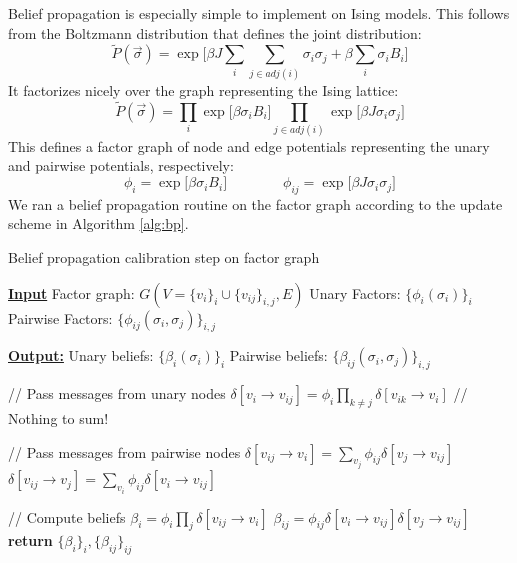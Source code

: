 \documentclass{article}
\begin{document}
Belief propagation is especially simple to implement on Ising models. 
This follows from the Boltzmann distribution that defines the joint distribution:
\begin{equation}\label{isingJoint}
    \tilde{P}(\vec{\sigma}) = \exp \Bigr [\beta J\sum_i \sum_{j \in adj(i)} \sigma_i \sigma_j + \beta \sum_i \sigma_i B_i \Bigr ]
\end{equation}
It factorizes nicely over the graph representing the Ising lattice:
\begin{equation}\label{gibbsFactorization}
    \tilde{P}(\vec{\sigma}) = \prod_i \exp \Bigr [\beta \sigma_i B_i \Bigr ] \prod_{j \in adj(i)} \exp \Bigr [ \beta J \sigma_i \sigma_j \Bigr ]
\end{equation}
This defines a factor graph of node and edge potentials representing the unary 
and pairwise potentials, respectively:
\[
    \phi_i = \exp \Bigr [\beta \sigma_i B_i \Bigr ]
    \qquad \qquad
    \phi_{ij} = \exp \Bigr [ \beta J \sigma_i \sigma_j \Bigr ]
\]
We ran a belief propagation routine on the factor graph according to the update 
scheme in Algorithm \ref{alg:bp}. 

\begin{algorithm}
    \caption{Belief propagation calibration step on factor graph}
    \begin{algorithmic}[1]
        \Statex \underline{\textbf{Input}}
        \Statex \quad Factor graph: $G(V = \{v_i\}_i \cup \{v_{ij}\}_{i, j}, E)$
        \Statex \quad Unary Factors: $\{\phi_i(\sigma_i)\}_i$
        \Statex \quad Pairwise Factors: $\{\phi_{ij}(\sigma_i, \sigma_j)\}_{i, j}$

        \Statex \underline{\textbf{Output:}}
        \Statex \quad Unary beliefs: $\{\beta_i(\sigma_i)\}_i$
        \Statex \quad Pairwise beliefs: $\{\beta_{ij}(\sigma_i, \sigma_j)\}_{i, j}$
        
        \Statex // Pass messages from unary nodes
        \State $\delta[v_i \rightarrow v_{ij}] = \phi_i \prod_{k \neq j} \delta[v_{ik} \rightarrow v_i]$ \quad // Nothing to sum!
        \EndFor
        \EndFor

        \Statex // Pass messages from pairwise nodes
        \State $\delta[v_{ij} \rightarrow v_i] = \sum_{v_j} \phi_{ij} \delta[v_j \rightarrow v_{ij}]$
        \State $\delta[v_{ij} \rightarrow v_j] = \sum_{v_i} \phi_{ij} \delta[v_i \rightarrow v_{ij}]$
        \EndFor
        \EndFor

        \Statex // Compute beliefs
        \State $\beta_i = \phi_i \prod_{j} \delta[v_{ij} \rightarrow v_i]$
        \EndFor
        \State $\beta_{ij} = \phi_{ij} \delta[v_i \rightarrow v_{ij}] \delta[v_j \rightarrow v_{ij}]$
        \EndFor
        \State \textbf{return } $\{\beta_i\}_i, \{\beta_{ij}\}_{ij}$
    \end{algorithmic}
    \label{alg:bp}
\end{algorithm}
\end{document}
